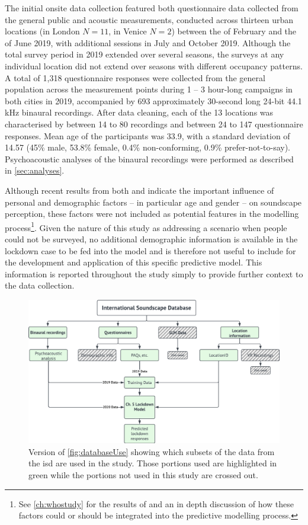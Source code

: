    The initial onsite data collection featured both questionnaire data collected from the general public and acoustic measurements, conducted across thirteen urban locations (in London $N=11$, in Venice $N=2$) between the  of February and the  of June 2019, with additional sessions in July and October 2019. Although the total survey period in 2019 extended over several seasons, the surveys at any individual location did not extend over seasons with different occupancy patterns. A total of 1,318 questionnaire responses were collected from the general population across the measurement points during 1 -- 3 hour-long campaigns in both cities in 2019, accompanied by 693 approximately 30-second long 24-bit 44.1 kHz binaural recordings. After data cleaning, each of the 13 locations was characterised by between 14 to 80 recordings and between 24 to 147 questionnaire responses. Mean age of the participants was 33.9, with a standard deviation of 14.57 (45\% male, 53.8\% female, 0.4\% non-conforming, 0.9\% prefer-not-to-say). Psychoacoustic analyses of the binaural recordings were performed as described in \cref{sec:analyses}.

   Although recent results from both \citet{Tarlao2020Investigating} and \citet{Erfanian2021Psychological} indicate the important influence of personal and demographic factors -- in particular age and gender -- on soundscape perception, these factors were not included as potential features in the modelling process\footnote{See \cref{ch:whostudy} for the results of \citet{Erfanian2021Psychological} and an in depth discussion of how these factors could or should be integrated into the predictive modelling process.}. Given the nature of this study as addressing a scenario when people could not be surveyed, no additional demographic information is available in the lockdown case to be fed into the model and is therefore not useful to include for the development and application of this specific predictive model. This information is reported throughout the study simply to provide further context to the data collection.

\begin{figure}[h]
  \centering
  \includegraphics[width=\textwidth]{Figures/Database use figure - Chap 5.png}
  \caption{Version of \cref{fig:databaseUse} showing which subsets of the data from the \gls{isd} are used in the study. Those portions used are highlighted in green while the portions not used in this study are crossed out. \label{fig:databaseUse5}}
\end{figure}

